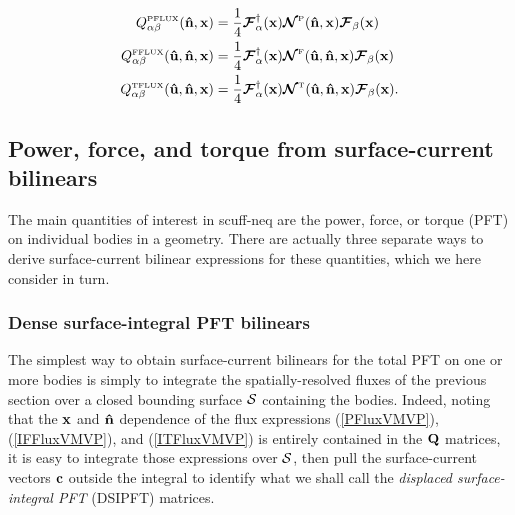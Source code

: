 \documentclass[letterpaper]{article}
\begin{document}
\begin{subequations}
\begin{align}
Q_{\alpha\beta}^{\hbox{\tiny{PFLUX}}}(\mathbf{\hat n}, \mathbf{x})
 &= \frac{1}{4} 
    \boldsymbol{\mathcal{F}}^\dagger_\alpha(\mathbf{x}) 
    \boldsymbol{\mathcal{N}}^{\hbox{\tiny{P}}}(\mathbf{\hat n}, \mathbf{x})
    \boldsymbol{\mathcal{F}}_\beta(\mathbf{x}) 
\\
Q_{\alpha\beta}^{\hbox{\tiny{FFLUX}}}(\mathbf{\hat u}, \mathbf{\hat n}, \mathbf{x})
 &= \frac{1}{4} 
    \boldsymbol{\mathcal{F}}^\dagger_\alpha(\mathbf{x}) 
    \boldsymbol{\mathcal{N}}^{\hbox{\tiny{F}}}(\mathbf{\hat u}, \mathbf{\hat n}, \mathbf{x})
    \boldsymbol{\mathcal{F}}_\beta(\mathbf{x}) 
\\
Q_{\alpha\beta}^{\hbox{\tiny{TFLUX}}}(\mathbf{\hat u}, \mathbf{\hat n}, \mathbf{x})
 &= \frac{1}{4} 
    \boldsymbol{\mathcal{F}}^\dagger_\alpha(\mathbf{x}) 
    \boldsymbol{\mathcal{N}}^{\hbox{\tiny{T}}}(\mathbf{\hat u}, \mathbf{\hat n}, \mathbf{x})
    \boldsymbol{\mathcal{F}}_\beta(\mathbf{x}).
\end{align}
\label{SixBySixVMVPs}
\end{subequations}

\subsection*{Power, force, and torque from surface-current bilinears}

The main quantities of interest in {\sc scuff-neq} are the
power, force, or torque (PFT) on individual bodies in a geometry.
There are actually three separate ways to derive surface-current 
bilinear expressions for these quantities, which we here consider 
in turn.

\subsubsection*{Dense surface-integral PFT bilinears}

The simplest way to obtain surface-current bilinears for the
total PFT on one or more bodies is simply to integrate the 
spatially-resolved fluxes of the previous section over a closed
bounding surface $\mathcal{S}$ containing the bodies.
Indeed, noting that the $\mathbf{x}$ and $\mathbf{\hat n}$ dependence of
the flux expressions (\ref{PFluxVMVP}), (\ref{IFFluxVMVP}),
and (\ref{ITFluxVMVP}) is entirely contained in the $\mathbf{Q}$
matrices, it is easy to integrate those expressions over
$\mathcal{S}$, then pull the surface-current vectors $\mathbf{c}$
outside the integral to identify what we shall call
the \textit{displaced surface-integral PFT} (DSIPFT) matrices. 
\end{document}
